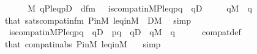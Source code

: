 \begin{isabellebody}
\ \ \isamarkupfalse%
\isanewline
\ \ \isamarkupfalse%
\ {\isachardoublequoteopen}{\isacharparenleft}{\kern0pt}M{\isacharcomma}{\kern0pt}\ {\isacharbrackleft}{\kern0pt}q{\isacharcomma}{\kern0pt}P{\isacharcomma}{\kern0pt}leq{\isacharcomma}{\kern0pt}p{\isacharcomma}{\kern0pt}D{\isacharbrackright}{\kern0pt}\ {\isasymTurnstile}\ {\isacharquery}{\kern0pt}d{\isacharunderscore}{\kern0pt}fm{\isacharparenright}{\kern0pt}\ {\isasymlongleftrightarrow}\ {\isacharparenleft}{\kern0pt}{\isasymnot}\ is{\isacharunderscore}{\kern0pt}compat{\isacharunderscore}{\kern0pt}in{\isacharparenleft}{\kern0pt}{\isacharhash}{\kern0pt}{\isacharhash}{\kern0pt}M{\isacharcomma}{\kern0pt}P{\isacharcomma}{\kern0pt}leq{\isacharcomma}{\kern0pt}p{\isacharcomma}{\kern0pt}q{\isacharparenright}{\kern0pt}\ {\isasymor}\ q{\isasymin}D{\isacharparenright}{\kern0pt}{\isachardoublequoteclose}\isanewline
\ \ \ \ \ {\isachardoublequoteopen}q{\isasymin}M{\isachardoublequoteclose}\ \ q\isanewline
\ \ \ \ \isamarkupfalse%
\ that\ sats{\isacharunderscore}{\kern0pt}compat{\isacharunderscore}{\kern0pt}in{\isacharunderscore}{\kern0pt}fm\ P{\isacharunderscore}{\kern0pt}in{\isacharunderscore}{\kern0pt}M\ leq{\isacharunderscore}{\kern0pt}in{\isacharunderscore}{\kern0pt}M\ {}\ {\isacartoucheopen}D{\isasymin}M{\isacartoucheclose}\ \isamarkupfalse%
\ simp\isanewline
\ \ \isamarkupfalse%
\isanewline
\ \ \isamarkupfalse%
\ {\isachardoublequoteopen}{\isacharparenleft}{\kern0pt}{\isasymnot}\ is{\isacharunderscore}{\kern0pt}compat{\isacharunderscore}{\kern0pt}in{\isacharparenleft}{\kern0pt}{\isacharhash}{\kern0pt}{\isacharhash}{\kern0pt}M{\isacharcomma}{\kern0pt}P{\isacharcomma}{\kern0pt}leq{\isacharcomma}{\kern0pt}p{\isacharcomma}{\kern0pt}q{\isacharparenright}{\kern0pt}\ {\isasymor}\ q{\isasymin}D{\isacharparenright}{\kern0pt}\ {\isasymlongleftrightarrow}\ p{\isasymbottom}q\ {\isasymor}\ q{\isasymin}D{\isachardoublequoteclose}\ \ {\isachardoublequoteopen}q{\isasymin}M{\isachardoublequoteclose}\ \ q\isanewline
\ \ \ \ \isamarkupfalse%
\ compat{\isacharunderscore}{\kern0pt}def\ \isamarkupfalse%
\ that\ compat{\isacharunderscore}{\kern0pt}in{\isacharunderscore}{\kern0pt}abs\ P{\isacharunderscore}{\kern0pt}in{\isacharunderscore}{\kern0pt}M\ leq{\isacharunderscore}{\kern0pt}in{\isacharunderscore}{\kern0pt}M\ {}\ \isamarkupfalse%
\ simp\isanewline
\ \ \isamarkupfalse%

\end{isabellebody}
